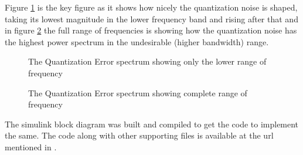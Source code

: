 \documentclass[colorlinks=true,pdfstartview=FitV,linkcolor=blue,
            citecolor=red,urlcolor=magenta]{ligodoc}
\begin{document}
Figure \ref{error1} is the key figure as it shows how nicely the quantization noise is shaped, taking its lowest magnitude in the lower frequency band and rising after that and in figure \ref{errorn} the full range of frequencies is showing how the quantization noise has the highest power spectrum in the undesirable (higher bandwidth) range.
\begin{figure}[htbp]
 
  \centering
  
  \caption{The Quantization Error spectrum showing only the lower range of frequency}
 \label{error1}
\end{figure}

\begin{figure}[htbp]
 
  \centering
  
  \caption{The Quantization Error spectrum showing complete range of frequency}
 \label{errorn}
\end{figure}



The simulink block diagram was built and compiled to get the code to implement the same. The code along with other supporting files is available at the url mentioned in \cite{Git}.
\end{document}
